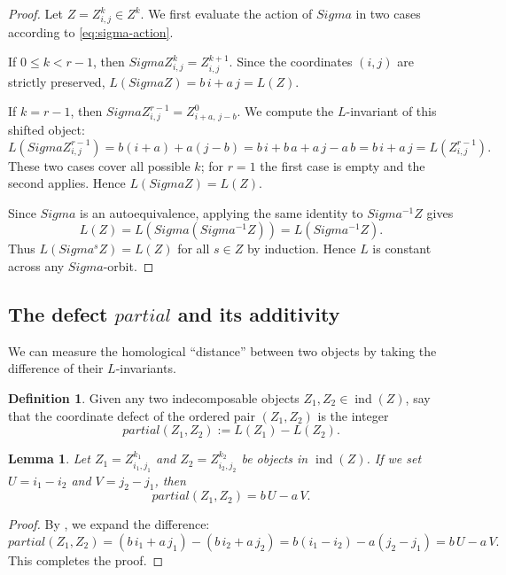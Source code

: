 \documentclass[11pt, a4paper]{article}
\newtheorem{lemma}[theorem]{Lemma}
\theoremstyle{definition}
\newtheorem{definition}[theorem]{Definition}
\def\Sigma{Sigma}%
\def\partial{partial}%
\def\mathbb#1{#1}%
\def\mathcal#1{#1}%
\begin{document}
\begin{proof}
Let $Z = Z_{i,j}^k \in \mathcal Z^k$. We first evaluate the action of $\Sigma$ in two cases according to \eqref{eq:sigma-action}.

If $0 \le k < r-1$, then $\Sigma Z_{i,j}^k = Z_{i,j}^{k+1}$. Since the coordinates $(i,j)$ are strictly preserved, $L(\Sigma Z) = b\,i + a\,j = L(Z)$.

If $k = r-1$, then $\Sigma Z_{i,j}^{r-1} = Z_{i+a,\, j-b}^0$. We compute the $L$-invariant of this shifted object:
\[
  L(\Sigma Z_{i,j}^{r-1}) = b(i+a) + a(j-b) = b\,i + b\,a + a\,j - a\,b = b\,i + a\,j = L(Z_{i,j}^{r-1}).
\]
These two cases cover all possible $k$; for $r=1$ the first case is empty and the second applies. Hence $L(\Sigma Z)=L(Z)$.

Since $\Sigma$ is an autoequivalence, applying the same identity to $\Sigma^{-1}Z$ gives
\[
  L(Z) = L(\Sigma(\Sigma^{-1}Z)) = L(\Sigma^{-1}Z).
\]
Thus $L(\Sigma^s Z)=L(Z)$ for all $s\in\mathbb Z$ by induction. Hence $L$ is constant across any $\Sigma$-orbit.
\end{proof}

\subsection{The defect \texorpdfstring{$\partial$}{partial} and its additivity}\label{subsec:defect}

We can measure the homological ``distance'' between two objects by taking the difference of their $L$-invariants.

\begin{definition}\label{def:defect}
Given any two indecomposable objects $Z_1, Z_2 \in \operatorname{ind}(\mathcal Z)$, say that the coordinate defect of the ordered pair $(Z_1, Z_2)$ is the integer
\[
  \partial(Z_1, Z_2) := L(Z_1) - L(Z_2).
\]
\end{definition}

\begin{lemma}\label{lem:defect-L}
Let $Z_1 = Z_{i_1, j_1}^{k_1}$ and $Z_2 = Z_{i_2, j_2}^{k_2}$ be objects in $\operatorname{ind}(\mathcal Z)$. If we set $U = i_1 - i_2$ and $V = j_2 - j_1$, then
\[
  \partial(Z_1, Z_2) = b\,U - a\,V.
\]
\end{lemma}

\begin{proof}
By , we expand the difference:
\[
  \partial(Z_1, Z_2) = (b\,i_1 + a\,j_1) - (b\,i_2 + a\,j_2) = b(i_1 - i_2) - a(j_2 - j_1) = b\,U - a\,V.
\]
This completes the proof.
\end{proof}
\end{document}
